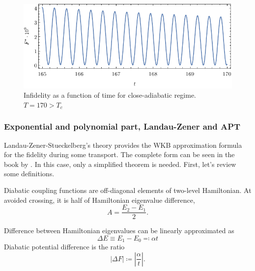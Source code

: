\begin{figure}[H]
    \centering
    \includegraphics[scale=1.2]{../img/overcritical.pdf}
    \caption{Infidelity as a function of time for close-adiabatic regime. $T=170>T_c$}
    \label{fig:overcritical}
\end{figure}

\subsubsection{Exponential and polynomial part, Landau-Zener and APT}
Landau-Zener-Stueckelberg's theory provides the WKB approximation formula for the fidelity during some transport. The complete form can be seen in the book by \citet{nonadiabaticTransition}. In this case, only a simplified theorem is needed. First, let's review some definitions.

\begin{definition}
    Diabatic coupling functions are off-diagonal elements of two-level Hamiltonian. At avoided crossing, it is half of Hamiltonian eigenvalue difference,
    \begin{equation}
        A=\frac{E_2-E_1}{2}.
    \end{equation}
\end{definition}
\begin{definition}
    Difference between Hamiltonian eigenvalues can be linearly approximated as
    \begin{equation}
        \Delta E\equiv E_1-E_0 \eqqcolon \alpha t
    \end{equation}
    Diabatic potential difference is the ratio
    \begin{equation}
        |\Delta F|\coloneqq \left|\frac{\alpha}{t}\right|.
    \end{equation}
\end{definition}

